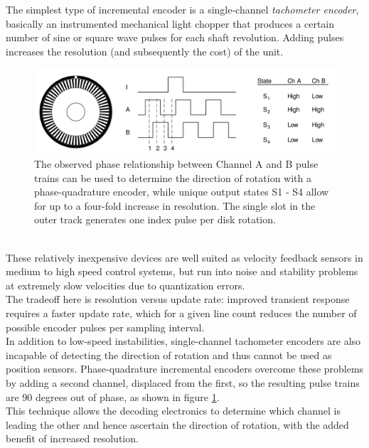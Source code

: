 The simplest type of incremental encoder is a single-channel
\textit{tachometer encoder}, basically an instrumented mechanical
light chopper that produces a certain number of sine or square wave
pulses for each shaft revolution. Adding pulses increases the resolution
(and subsequently the cost) of the unit.
\begin{figure} [h]
  \begin{center}
    \includegraphics[width=\textwidth]{img/incremental_encoder.png}
    \caption{The observed phase relationship between Channel A and B
      pulse trains can be used to determine
      the direction of rotation with a phase-quadrature encoder,
      while unique output states S1 - S4 allow for up to a
      four-fold increase in resolution. The single slot in the outer
      track generates one index pulse per disk rotation.
    }
    \label{fig:incremental_encoder}
  \end{center}
\end{figure}
\\
These relatively inexpensive devices are well suited as velocity feedback
sensors in medium to high speed control systems, but run into noise and
stability problems at extremely slow velocities due to quantization errors.
\\
The tradeoff here is resolution versus update rate: improved transient
response requires a faster update rate, which for a given line count reduces
the number of possible encoder pulses per sampling interval. 
\\
In addition to low-speed instabilities, single-channel tachometer encoders
are also incapable of detecting the direction of rotation and thus cannot
be used as position sensors. Phase-quadrature incremental encoders overcome
these problems by adding a second channel, displaced from the
first, so the resulting pulse trains are 90 degrees out of phase, as shown
in figure \ref{fig:incremental_encoder}.
\\
This technique allows the decoding electronics to determine which channel
is leading the other and hence ascertain the direction of rotation, with the
added benefit of increased resolution.
